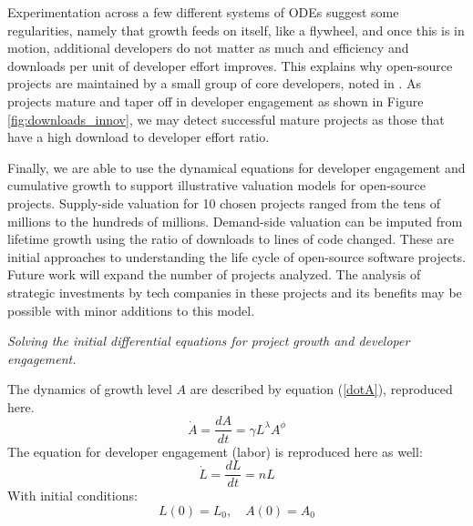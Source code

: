 \documentclass[conference]{IEEEtran}
\begin{document}
Experimentation across a few different systems of ODEs suggest some regularities, namely that growth feeds on itself, like a flywheel, and once this is in motion, additional developers do not matter as much and efficiency and downloads per unit of developer effort improves. This explains why open-source projects are maintained by a small group of core developers, noted in \cite{droesch_measuring_2020}. As projects mature and taper off in developer engagement as shown in Figure \ref{fig:downloads_innov}, we may detect successful mature projects as those that have a high download to developer effort ratio.

Finally, we are able to use the dynamical equations for developer engagement and cumulative growth to support illustrative valuation models for open-source projects. Supply-side valuation for 10 chosen projects ranged from the tens of millions to the hundreds of millions. Demand-side valuation can be imputed from lifetime growth using the ratio of downloads to lines of code changed. These are initial approaches to understanding the life cycle of open-source software projects. Future work will expand the number of projects analyzed. The analysis of strategic investments by tech companies in these projects and its benefits may be possible with minor additions to this model. 
 


 



\appendix

{\it Solving the initial differential equations for project growth and developer engagement.}

The dynamics of growth level $A$ are described by equation (\ref{dotA}), reproduced here.    
\begin{equation}
{\dot A} = \frac{dA}{dt} = \gamma L^{\lambda} A^{\phi} \end{equation}
The equation for developer engagement (labor) is reproduced here as well:
\begin{equation}
{\dot L} = \frac{dL}{dt} = n L  \label{dotL}
\end{equation}
With initial conditions:
$$
L(0) = L_0, \quad A(0) = A_0
$$
\end{document}
